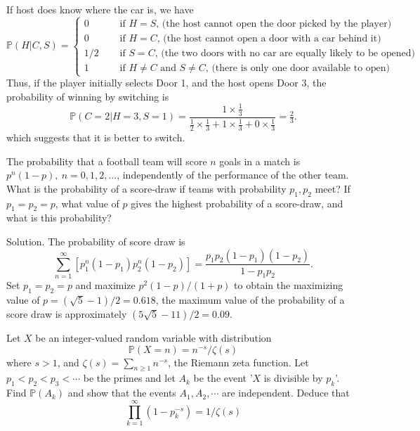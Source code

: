 If host does know where the car is, we have
\begin{equation}
\mathbb{P}(H | C, S) =\left\{
\begin{array}{cl}
0 & \quad\text { if $H = S$, (the host cannot open the door picked by the player)}\\
0 & \quad\text { if $H = C$, (the host cannot open a door with a car behind it)}\\
1/2  & \quad\text { if $S = C$, (the two doors with no car are equally likely to be opened)}\\
1 & \quad\text { if $H \ne C$ and $S \ne C$, (there is only one door available to open)}
\end{array}\right.
\end{equation}
Thus, if the player initially selects Door 1, and the host opens Door 3, the probability of winning by switching is
\begin{equation}
\mathbb{P}(C=2|H=3, S=1) = \frac{1\times\frac 13}{\frac 12 \times \frac 13 + 1\times\frac 13 + 0 \times \frac 13}=\tfrac 23.
\end{equation}
which suggests that it is better to switch. 


\item The probability that a football team will score $n$ goals in a match is $p^n(1-p),\ n=0,1,2,\dots$, independently of the performance of the other team. What is the probability of a score-draw if teams with probability $p_1,p_2$ meet? If $p_1=p_2=p$, what value of $p$ gives the highest probability of a score-draw, and what is this probability?

Solution. The probability of score draw is 
\begin{equation}
\sum^\infty_{n=1}\left[p_1^n(1-p_1)p_2^n(1-p_2)\right]=\frac{p_1p_2(1-p_1)(1-p_2)}{1-p_1p_2}.
\end{equation}
Set $p_1=p_2=p$ and maximize $p^2(1-p)/(1+p)$ to obtain the maximizing value of $p=(\sqrt{5}-1)/2=0.618$, the maximum value of the probability of a score draw is approximately $(5\sqrt{5}-11)/2=0.09$.


\item Let $X$ be an integer-valued random variable with distribution
\begin{equation}
\mathbb{P}(X=n)=n^{-s}/\zeta(s)
\end{equation}
where $s>1$, and $\zeta(s)=\sum_{n\geq 1}n^{-s}$, the Riemann zeta function. Let $p_1<p_2<p_3<\cdots$ be the primes and let $A_k$ be the event '$X$ is divisible by $p_k$'. Find $\mathbb{P}(A_k)$ and show that the events $A_1,A_2,\cdots$ are independent. Deduce that 
\begin{equation}
\prod^\infty_{k=1}(1-p_k^{-s})=1/\zeta(s)
\end{equation}



